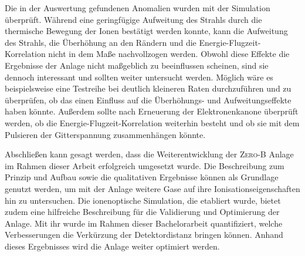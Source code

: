 Die in der Auswertung gefundenen Anomalien wurden mit der Simulation überprüft. Während eine geringfügige Aufweitung des Strahls durch die thermische Bewegung der Ionen bestätigt werden konnte, kann die Aufweitung des Strahls, die Überhöhung an den Rändern und die Energie-Flugzeit-Korrelation nicht in dem Maße nachvollzogen werden. Obwohl diese Effekte die Ergebnisse der Anlage nicht maßgeblich zu beeinflussen scheinen, sind sie dennoch interessant und sollten weiter untersucht werden. Möglich wäre es beispielsweise eine Testreihe bei deutlich kleineren Raten durchzuführen und zu überprüfen, ob das einen Einfluss auf die Überhöhungs- und Aufweitungseffekte haben könnte. Außerdem sollte nach Erneuerung der Elektronenkanone überprüft werden, ob die Energie-Flugzeit-Korrelation weiterhin besteht und ob sie mit dem Pulsieren der Gitterspannung zusammenhängen könnte.

Abschließen kann gesagt werden, dass die Weiterentwicklung der \textsc{Zero-B} Anlage im Rahmen dieser Arbeit erfolgreich umgesetzt wurde. Die Beschreibung zum Prinzip und Aufbau sowie die qualitativen Ergebnisse können als Grundlage genutzt werden, um mit der Anlage weitere Gase auf ihre Ionisationseigenschaften hin zu untersuchen. Die ionenoptische Simulation, die etabliert wurde, bietet zudem eine hilfreiche Beschreibung für die Validierung und Optimierung der Anlage. Mit ihr wurde im Rahmen dieser Bachelorarbeit quantifiziert, welche Verbesserungen die Verkürzung der Detektordistanz bringen können. Anhand dieses Ergebnisses wird die Anlage weiter optimiert werden. 
